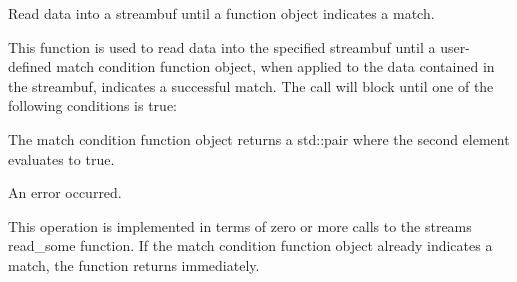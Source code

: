 Read data into a streambuf until a function object indicates a match. 

This function is used to read data into the specified streambuf until a user-\/defined match condition function object, when applied to the data contained in the streambuf, indicates a successful match. The call will block until one of the following conditions is true\+:

\begin{DoxyItemize}
\item The match condition function object returns a std\+::pair where the second element evaluates to true.\end{DoxyItemize}
\begin{DoxyItemize}
\item An error occurred.\end{DoxyItemize}
This operation is implemented in terms of zero or more calls to the stream\textquotesingle{}s read\+\_\+some function. If the match condition function object already indicates a match, the function returns immediately.


